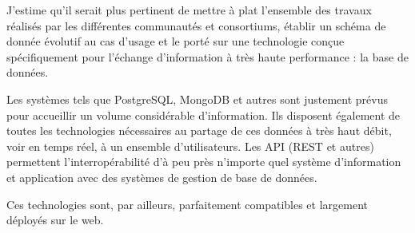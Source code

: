 J'estime qu'il serait plus pertinent de mettre à plat l'ensemble des travaux réalisés par les différentes communautés et consortiums, établir un schéma de donnée évolutif au cas d'usage et le porté sur une technologie conçue spécifiquement pour l'échange d'information à très haute performance : la base de données.

Les systèmes tels que PostgreSQL, MongoDB et autres sont justement prévus pour accueillir un volume considérable d'information. Ils disposent également de toutes les technologies nécessaires au partage de ces données à très haut débit, voir en temps réel, à un ensemble d'utilisateurs. Les API (REST et autres) permettent l'interropérabilité d'à peu près n'importe quel système d'information et application avec des systèmes de gestion de base de données.

Ces technologies sont, par ailleurs, parfaitement compatibles et largement déployés sur le web.


\medskip



